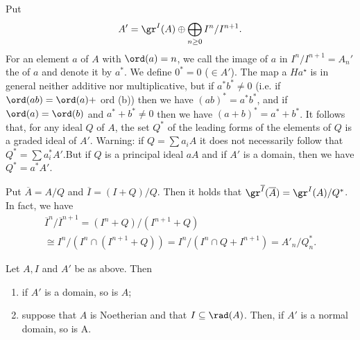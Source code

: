 \documentclass[../main]{subfiles}
\begin{document}
Put \[A'=\gr^I(A) \oplus \bigoplus_{n\geq 0} I^n/I^{n+1}.\] For an element $a$ of $A$ with $\ord(a)=n$, we call the image of $a$ in $I^n / I^{n+1}=A_n'$ the  of $a$ and denote it by $a^{\ast}$. We define $0^{\ast}=0$ ($\in A'$). The map a $H a^{\star}$ is in general neither additive nor multiplicative, but if $a^{\ast} b^{\ast} \neq 0$ (i.e. if $\ord(a b)=\ord(a)+$ ord (b)) then we have $(a b)^\ast=a^\ast b^\ast$, and if $\ord(a)=\ord(b)$ and $a^{\ast}+b^{\ast} \neq 0$ then we have $(a+b)^{\ast}=a^{\ast}+b^{\ast}$. It follows that, for any ideal $Q$ of $A$, the set $Q^{\ast}$ of the leading forms of the elements of $Q$ is a graded ideal of $A'$. Warning: if $Q=\sum a_iA$ it does not necessarily follow that $Q^{\ast}=\sum a_i^{\ast} A'$.But if $Q$ is a principal ideal $aA$ and if $A'$ is a domain, then we have $Q^{\ast}=a^{\ast} A'$.

Put $\overline{A} = A/Q$ and $\overline{I}= (I+Q)/Q$. Then it holds that $\gr^{\overline{I}}(\overline{A}) = \gr^I(A)/Q^\ast$. In fact, we have \begin{gather*}\overline{I}^n/\overline{I}^{n+1}=(I^n+Q)/(I^{n+1}+Q)\\\cong I^n/(I^n\cap (I^{n+1}+Q))= I^n/(I^n\cap Q+ I^{n+1}) = A'_n/Q^\ast_n.\end{gather*}


\begin{partheorem}[Krull]\label{thm:034}
 Let $A, I$ and $A'$ be as above. Then
 \begin{enumerate}
     \item if $A'$ is a domain, so is $A$;
     \item suppose that $A$ is Noetherian and that $I \subseteq \rad(A)$. Then, if $A'$ is a normal domain, so is A.
 \end{enumerate}
\end{partheorem}
\end{document}
